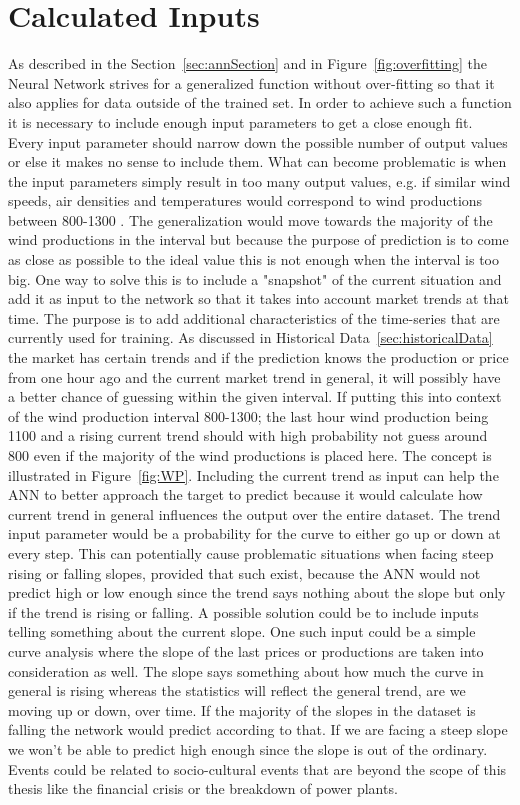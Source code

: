 \section{Calculated Inputs}
\label{sec:usingStatisticalInput}
As described in the Section~\ref{sec:annSection} and in Figure~\ref{fig:overfitting} the Neural Network strives for a generalized function without over-fitting so that it also applies for data outside of the trained set. In order to achieve such a function it is necessary to include enough input parameters to get a close enough fit. Every input parameter should narrow down the possible number of output values or else it makes no sense to include them. What can become problematic is when the input parameters simply result in too many output values, e.g. if similar wind speeds, air densities and temperatures would correspond to wind productions between 800-1300 . The generalization would move towards the majority of the wind productions in the interval but because the purpose of prediction is to come as close as possible to the ideal value this is not enough when the interval is too big. One way to solve this is to include a "snapshot" of the current situation and add it as input to the network so that it takes into account market trends at that time. The purpose is to add additional characteristics of the time-series that are currently used for training. As discussed in Historical Data~\ref{sec:historicalData} the market has certain trends and if the prediction knows the production or price from one hour ago and the current market trend in general, it will possibly have a better chance of guessing within the given interval. If putting this into context of the wind production interval 800-1300; the last hour wind production being 1100 and a rising current trend should with high probability not guess around 800 even if the majority of the wind productions is placed here. The concept is illustrated in Figure~\ref{fig:WP}. Including the current trend as input can help the ANN to better approach the target to predict because it  would calculate how current trend in general influences the output over the entire dataset. The trend input parameter would be a probability for the curve to either go up or down at every step. This can potentially cause problematic situations when facing steep rising or falling slopes, provided that such exist, because the ANN would not predict high or low enough since the trend says nothing about the slope but only if the trend is rising or falling. A possible solution could be to include inputs telling something about the current slope. One such input could be a simple curve analysis where the slope of the last prices or productions are taken into consideration as well. The slope says something about how much the curve in general is rising whereas the statistics will reflect the general trend, are we moving up or down, over time. If the majority of the slopes in the dataset is falling the network would predict according to that. If we are facing a steep slope we won't be able to predict high enough since the slope is out of the ordinary. Events could be related to socio-cultural events that are beyond the scope of this thesis like the financial crisis or the breakdown of power plants.

